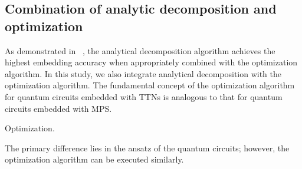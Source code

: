 \documentclass[12pt,dvipdfmx,twoside,openright]{report}
\begin{document}
\subsection{Combination of analytic decomposition and optimization}
As demonstrated in ~\cite{mpsdecomp}, the analytical decomposition algorithm achieves the highest embedding accuracy when appropriately combined with the optimization algorithm.
In this study, we also integrate analytical decomposition with the optimization algorithm.
The fundamental concept of the optimization algorithm for quantum circuits embedded with TTNs is analogous to that for quantum circuits embedded with MPS. 
\begin{algorithm}[tbp]
 \caption{Optimization.}
 \label{algorithm:optimization}
\end{algorithm}
The primary difference lies in the ansatz of the quantum circuits; however, the optimization algorithm can be executed similarly.
\end{document}
